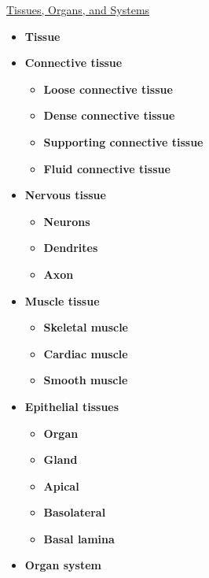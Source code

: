 \documentclass[12pt,letterpaper]{article}
\begin{document}
\hypertarget{39.2}{}
\begin{secbox}{\hyperlink{39}{Tissues, Organs, and Systems}}{
    \begin{itemize}
        \item \textbf{Tissue}
        \item \textbf{Connective tissue}
        \begin{itemize}
            \item \textbf{Loose connective tissue }
            \item \textbf{Dense connective tissue}
            \item \textbf{Supporting connective tissue}
            \item \textbf{Fluid connective tissue }
        \end{itemize}
        \item \textbf{Nervous tissue}
        \begin{itemize}
            \item \textbf{Neurons}
            \item \textbf{Dendrites}
            \item \textbf{Axon}
        \end{itemize}
        \item \textbf{Muscle tissue}
        \begin{itemize}
            \item \textbf{Skeletal muscle}
            \item \textbf{Cardiac muscle}
            \item \textbf{Smooth muscle }
        \end{itemize}
        \item \textbf{Epithelial tissues }
        \begin{itemize}
            \item \textbf{Organ}
            \item \textbf{Gland}
            \item \textbf{Apical }
            \item \textbf{Basolateral}
            \item \textbf{Basal lamina}
        \end{itemize}
        \item \textbf{Organ system }
    \end{itemize}
}\end{secbox}
\end{document}
